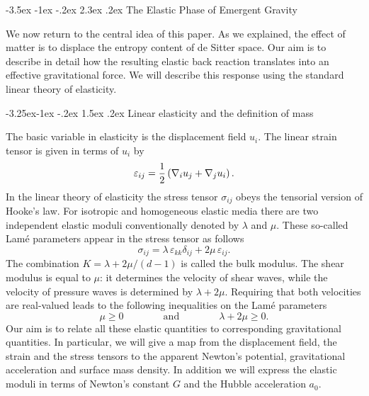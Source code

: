 \documentclass[a4paper,12pt]{article}
\makeatletter
\renewcommand\section{\@startsection {section}{1}{\z@}%
                                   {-3.5ex \@plus -1ex \@minus -.2ex}%
                                   {2.3ex \@plus.2ex}%
                                   {\normalfont\large\bfseries}}
\renewcommand\subsection{\@startsection{subsection}{2}{\z@}%
                                     {-3.25ex\@plus -1ex \@minus -.2ex}%
                                     {1.5ex \@plus .2ex}%
                                     {\normalfont\bfseries}}
\newcommand{\be}{\begin{equation}}
\newcommand{\ee}{\end{equation}}
\makeatother
\begin{document}
\vspace{1cm}

\section{The Elastic Phase of Emergent Gravity}
\setcounter{equation}{0}  
  
We now return to the central idea of this paper. As we explained, the effect of matter is to displace the entropy content of de Sitter space. Our aim is to describe in detail how the resulting elastic back reaction translates into an effective gravitational force. We will describe this response using the standard linear theory of elasticity.

\subsection{Linear elasticity and the definition of mass}

The basic variable in elasticity is the displacement field $u_i$. The linear strain tensor is given in terms of $u_i$ by
\be
\label{straindef}
\varepsilon_{ij} ={1\over 2}\left(\nabla_i u_j+ \nabla_j u_i\right). %
\ee
In the linear theory of elasticity the stress tensor $\sigma_{ij}$ obeys the tensorial version of Hooke's law. For isotropic and 
homogeneous elastic media there are two independent elastic moduli conventionally denoted by  $\lambda$ and $\mu$.    These so-called Lam\'{e} parameters appear in the stress tensor as follows
 \be
 \label{stress}
\sigma_{ij}= \lambda\, \varepsilon_{kk} \delta_{ij} + 2\mu\, \varepsilon_{ij} . %
 \ee 
The combination $K=\lambda + 2\mu/(d-1) $ is called the bulk modulus. The shear modulus is equal to $\mu$: it determines the velocity of shear waves, while the velocity of pressure waves is determined by $\lambda + 2\mu$.   Requiring that both velocities are real-valued leads to the following inequalities on the Lam\'e parameters 
\be
\mu \geq 0 \qquad \qquad \mbox{and}\qquad \qquad \lambda +2\mu\geq 0.
\ee
Our aim is to relate all these elastic quantities to corresponding gravitational quantities.  In particular, we will give a map from the displacement field, the strain and the stress tensors to the apparent  Newton's potential, gravitational acceleration and surface mass density. In addition we will express  the elastic moduli in terms of Newton's constant $G$ and the Hubble acceleration $a_0$.
\end{document}
